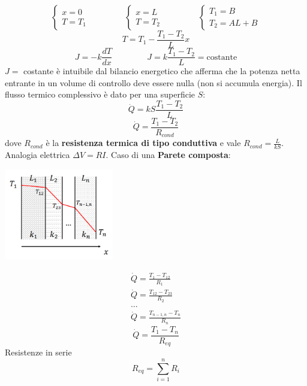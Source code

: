 \[
    \begin{cases}
        x = 0\\ T = T_1
    \end{cases} \;\;\;\;\;\;\;\;\;\;\;\;\;\;\; \begin{cases}
        x = L\\ T = T_2
    \end{cases} \;\;\;\;\;\;\;\;\;\;\;\;\;\;\; \begin{cases}
        T_1 = B \\ T_2 = AL+B
    \end{cases}
\]
\[
    T = T_1 - \frac{T_1-T_2}{L}x
\]
\[
    J = - k \frac{dT}{dx} \;\;\;\;\;\;\;\;\;\;\;\;\;\;\; J = k \frac{T_1-T_2}{L} = \text{costante}
\]
$J =$ costante è intuibile dal bilancio energetico che afferma che la potenza netta entrante in un volume di controllo deve essere nulla (non si accumula energia).\newline
\newline
Il flusso termico complessivo è dato per una superficie $S$:
\[
    \dot{Q} = k S \frac{T_1-T_2}{L}
\]
\[
    \dot{Q} = \frac{T_1-T_2}{R_{cond}}
\]
dove $R_{cond}$ è la \textbf{resistenza termica di tipo conduttiva} e vale $R_{cond} = \frac{L}{kS}$.\newline
\newline
Analogia elettrica $\Delta V = RI$.\newline
\newline
Caso di una \textbf{Parete composta}:
\begin{center}
    \includegraphics[height=4cm]{../L10/img3.PNG}
\end{center}
\[
    \begin{matrix}
        \dot{Q} = \frac{T_1-T_{12}}{R_1}\\
        \dot{Q} = \frac{T_{12} - T_{23}}{R_2}\\
        \dots\\
        \dot{Q} = \frac{T_{n-1,n} - T_{n}}{R_n}
    \end{matrix}  
\]
\[
    \dot{Q} = \frac{T_1-T_n}{R_{eq}}
\]
Resistenze in serie
\[
    R_{eq} = \sum_{i=1}^{n}R_i
\]
